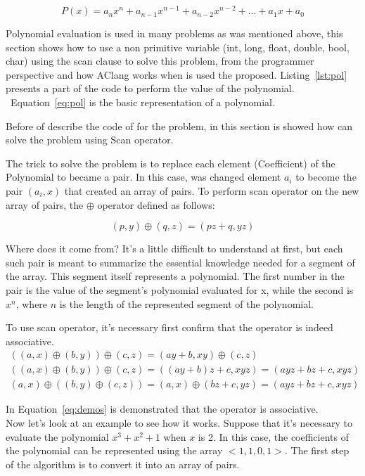 \documentclass[Ingles]{ic-tese-v1}
\newcommand{\req}[1]{Equation~\ref{eq:#1}}
\newcommand{\rlst}[1]{Listing~\ref{lst:#1}}
\begin{document}
\begin{equation}
P(x) = a_{n}x^n + a_{n-1}x^{n-1} + a_{n-2}x^{n-2} + ... + a_{1}x + a_{0}
\label{eq:pol}
\end{equation}

Polynomial evaluation is used in many problems as was mentioned above, this
section shows how to use a non primitive variable (int, long, float, double, bool, char)
using the scan clause to solve this problem, from the programmer perspective
and how AClang works when is used the proposed. \rlst{pol} presents
a part of the code to perform the value of the polynomial. ~\req{pol} is the basic
representation of a polynomial.

Before of describe the code of for the problem, in this section is
showed how can solve the problem using Scan operator.

The trick to solve the problem is to replace each element (Coefficient) of the Polynomial to became a pair. In this case, was changed element $a_{i}$ to become the pair $(a_{i}, x)$ that
created an array of pairs. To perform scan operator on the new array of pairs, the $\oplus$ operator defined as follows:

\begin{equation}
(p, y) \oplus (q, z) = (p z + q, y z)
\label{eq:opepol}
\end{equation}

Where does it come from? It's a little difficult to understand at first, but
each such pair is meant to summarize the essential knowledge needed for a
segment of the array. This segment itself represents a polynomial. The first
number in the pair is the value of the segment's polynomial evaluated for x,
while the second is $x^{n}$, where $n$ is the length of the represented segment
of the polynomial.

To use scan operator, it's necessary first confirm that the operator is indeed associative.
\begin{equation}
\begin{split}
((a, x) \oplus (b, y)) \oplus (c, z) = (a y + b, x y) \oplus (c, z) \\
((a, x) \oplus (b, y)) \oplus (c, z) = ((a y + b) z + c, x y z) = (a y z + b z + c, x y z)\\
(a, x) \oplus ((b, y) \oplus (c, z)) = (a, x) \oplus (b z + c, y z) = (a y z + b z + c, x y z)
\end{split}
\label{eq:demos}
\end{equation}

In \req{demos} is demonstrated that the operator is associative. \\
Now let's look at an example to see how it works. Suppose that it's necessary to evaluate the
polynomial $x^{3} + x^{2} + 1$ when $x$ is 2. In this case, the coefficients of the
polynomial can be represented using the array $<1, 1, 0, 1>$. The first step of the
algorithm is to convert it into an array of pairs.
\end{document}
